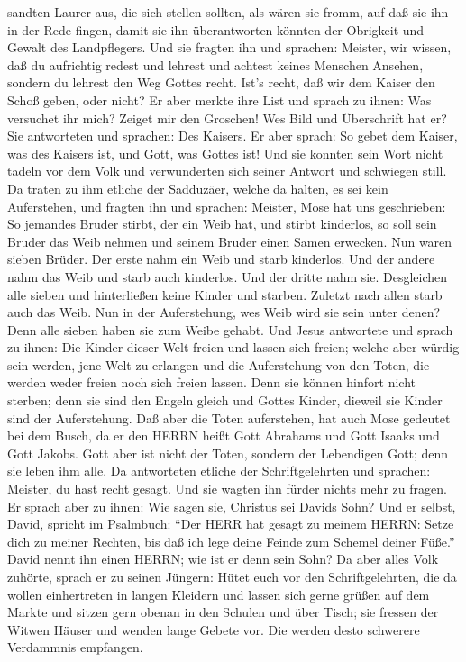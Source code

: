 sandten Laurer aus, die sich stellen sollten, als wären sie fromm, auf
daß sie ihn in der Rede fingen, damit sie ihn überantworten könnten der
Obrigkeit und Gewalt des Landpflegers.  Und sie fragten ihn
und sprachen: Meister, wir wissen, daß du aufrichtig redest und lehrest
und achtest keines Menschen Ansehen, sondern du lehrest den Weg Gottes
recht.  Ist's recht, daß wir dem Kaiser den Schoß geben,
oder nicht?  Er aber merkte ihre List und sprach zu ihnen:
Was versuchet ihr mich?  Zeiget mir den Groschen! Wes Bild
und Überschrift hat er? Sie antworteten und sprachen: Des Kaisers.
 Er aber sprach: So gebet dem Kaiser, was des Kaisers ist,
und Gott, was Gottes ist!  Und sie konnten sein Wort nicht
tadeln vor dem Volk und verwunderten sich seiner Antwort und schwiegen
still.  Da traten zu ihm etliche der Sadduzäer, welche da
halten, es sei kein Auferstehen, und fragten ihn  und
sprachen: Meister, Mose hat uns geschrieben: So jemandes Bruder stirbt,
der ein Weib hat, und stirbt kinderlos, so soll sein Bruder das Weib
nehmen und seinem Bruder einen Samen erwecken.  Nun waren
sieben Brüder. Der erste nahm ein Weib und starb kinderlos.
 Und der andere nahm das Weib und starb auch kinderlos.
 Und der dritte nahm sie. Desgleichen alle sieben und
hinterließen keine Kinder und starben.  Zuletzt nach allen
starb auch das Weib.  Nun in der Auferstehung, wes Weib
wird sie sein unter denen? Denn alle sieben haben sie zum Weibe gehabt.
 Und Jesus antwortete und sprach zu ihnen: Die Kinder
dieser Welt freien und lassen sich freien;  welche aber
würdig sein werden, jene Welt zu erlangen und die Auferstehung von den
Toten, die werden weder freien noch sich freien lassen. 
Denn sie können hinfort nicht sterben; denn sie sind den Engeln gleich
und Gottes Kinder, dieweil sie Kinder sind der Auferstehung.
 Daß aber die Toten auferstehen, hat auch Mose gedeutet bei
dem Busch, da er den HERRN heißt Gott Abrahams und Gott Isaaks und Gott
Jakobs.  Gott aber ist nicht der Toten, sondern der
Lebendigen Gott; denn sie leben ihm alle.  Da antworteten
etliche der Schriftgelehrten und sprachen: Meister, du hast recht
gesagt.  Und sie wagten ihn fürder nichts mehr zu fragen.
 Er sprach aber zu ihnen: Wie sagen sie, Christus sei
Davids Sohn?  Und er selbst, David, spricht im Psalmbuch:
``Der HERR hat gesagt zu meinem HERRN: Setze dich zu meiner Rechten,
 bis daß ich lege deine Feinde zum Schemel deiner Füße.''
 David nennt ihn einen HERRN; wie ist er denn sein Sohn?
 Da aber alles Volk zuhörte, sprach er zu seinen Jüngern:
 Hütet euch vor den Schriftgelehrten, die da wollen
einhertreten in langen Kleidern und lassen sich gerne grüßen auf dem
Markte und sitzen gern obenan in den Schulen und über Tisch;
 sie fressen der Witwen Häuser und wenden lange Gebete vor.
Die werden desto schwerere Verdammnis empfangen.

